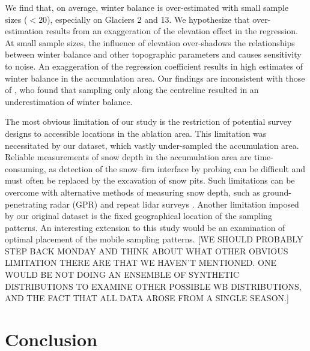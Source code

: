 \documentclass[twocolumn,letterpaper]{igs}
\begin{document}
We find that, on average, winter balance is over-estimated with small sample sizes ($<20$), especially on Glaciers 2 and 13. We hypothesize that over-estimation results from an exaggeration of the elevation effect in the regression.
At small sample sizes, the influence of elevation over-shadows the relationships between winter balance and other topographic parameters and causes sensitivity to noise. An exaggeration of the regression coefficient results in high estimates of winter balance in the accumulation area. Our findings are inconsistent with those of \cite{Walmsley2015}, who found that sampling only along the centreline resulted in an underestimation of winter balance.

The most obvious limitation of our study is the restriction of potential survey designs to accessible locations in the ablation area. This limitation was necessitated by our dataset, which vastly under-sampled the accumulation area.
Reliable measurements of snow depth in the accumulation area are time-consuming, as detection of the snow--firn interface by probing can be difficult and must often be replaced by the excavation of snow pits. 
Such limitations can be overcome with alternative methods of measuring snow depth, such as ground-penetrating radar (GPR) \citep[e.g.][]{Machguth2006, Gusmeroli2014, McGrath2015} and repeat lidar surveys \citep[e.g.][]{Sold2013}. Another limitation imposed by our original dataset is the fixed geographical location of the sampling patterns. An interesting extension to this study would be an examination of optimal placement of the mobile sampling patterns. %
[WE SHOULD PROBABLY STEP BACK MONDAY AND THINK ABOUT WHAT OTHER OBVIOUS LIMITATION THERE ARE THAT WE HAVEN'T MENTIONED. ONE WOULD BE NOT DOING AN ENSEMBLE OF SYNTHETIC DISTRIBUTIONS TO EXAMINE OTHER POSSIBLE WB DISTRIBUTIONS, AND THE FACT THAT ALL DATA AROSE FROM A SINGLE SEASON.]

\section{Conclusion}
\end{document}
